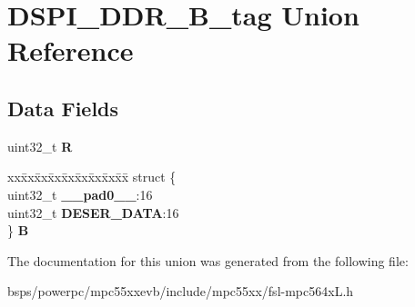 \hypertarget{unionDSPI__DDR__32B__tag}{}\section{D\+S\+P\+I\+\_\+\+D\+D\+R\+\_\+B\+\_\+tag Union Reference}
\label{unionDSPI__DDR__32B__tag}
\subsection*{Data Fields}
\begin{DoxyCompactItemize}
\item 
\mbox{\label{unionDSPI__DDR__32B__tag_a60196c12ae6a7961697caaec6167baa9}} 
uint32\+\_\+t {\bfseries R}
\item 
\mbox{\label{unionDSPI__DDR__32B__tag_ab22b61c5f5e652d217da0f85cb488688}} 
\begin{tabbing}
xx\=xx\=xx\=xx\=xx\=xx\=xx\=xx\=xx\=\kill
struct \{\\
\>uint32\_t {\bfseries \_\_pad0\_\_}:16\\
\>uint32\_t {\bfseries DESER\_DATA}:16\\
\} {\bfseries B}\\

\end{tabbing}\end{DoxyCompactItemize}


The documentation for this union was generated from the following file\+:\begin{DoxyCompactItemize}
\item 
bsps/powerpc/mpc55xxevb/include/mpc55xx/fsl-\/mpc564x\+L.\+h\end{DoxyCompactItemize}
